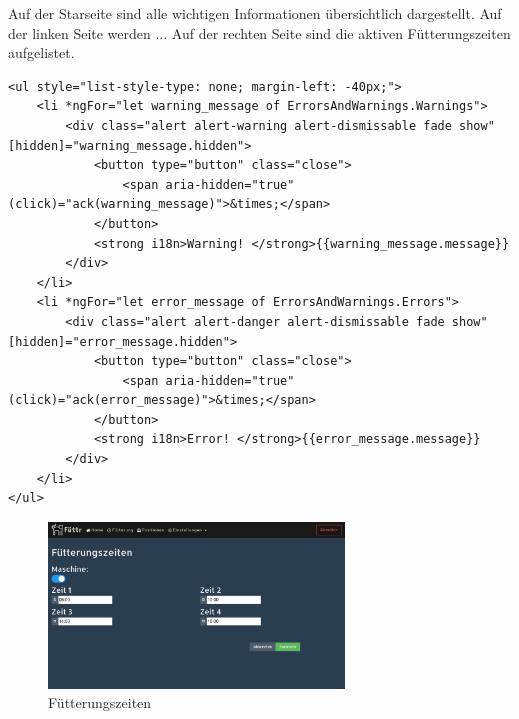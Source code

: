Auf der Starseite sind alle wichtigen Informationen übersichtlich dargestellt. Auf der linken Seite werden ... Auf der rechten Seite sind die aktiven Fütterungszeiten aufgelistet.

\begin{lstlisting}[style=HtmlStyle,caption=Errors and Warnings in einem *Ngfor]
<ul style="list-style-type: none; margin-left: -40px;">
	<li *ngFor="let warning_message of ErrorsAndWarnings.Warnings">
    	<div class="alert alert-warning alert-dismissable fade show" [hidden]="warning_message.hidden">
        	<button type="button" class="close">
            	<span aria-hidden="true" (click)="ack(warning_message)">&times;</span>
            </button>
            <strong i18n>Warning! </strong>{{warning_message.message}}
        </div>
    </li>
    <li *ngFor="let error_message of ErrorsAndWarnings.Errors">
        <div class="alert alert-danger alert-dismissable fade show" [hidden]="error_message.hidden">
	        <button type="button" class="close">
	            <span aria-hidden="true" (click)="ack(error_message)">&times;</span>
            </button>
            <strong i18n>Error! </strong>{{error_message.message}}
        </div>
    </li>
</ul>
\end{lstlisting}

\begin{figure}
\vspace{-30pt}
  \begin{center}
    \includegraphics[width=0.7\textwidth]{Bilder/Greistorfer/Fuetterungszeiten.png}
  \end{center}
  \caption{Fütterungszeiten}
  \label{Fütterungszeiten}
  \vspace{-10pt}
\end{figure}

